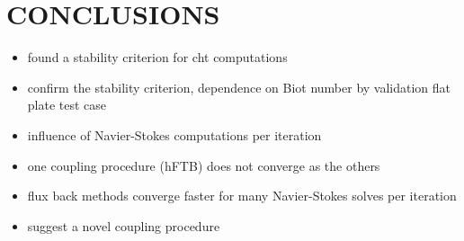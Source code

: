 \section{CONCLUSIONS}
\begin{itemize}
\item found a stability criterion for cht computations
\item confirm the stability criterion, dependence on Biot number by validation flat plate test case
\item influence of Navier-Stokes computations per iteration
\item one coupling procedure (hFTB) does not converge as the others
\item flux back methods converge faster for many Navier-Stokes solves per iteration
\item suggest a novel coupling procedure
\end{itemize}

